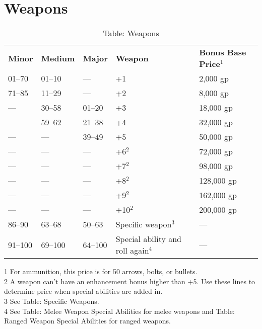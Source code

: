 \section{Weapons}

\label{f0}		
\begin{table}[]
\sffamily
\caption{Table: Weapons}
\begin{tabular}{lllll}
\textbf{Minor} & \textbf{Medium} & \textbf{Major} & \textbf{Weapon} & \textbf{Bonus Base Price\(^{1}\)}\\
01–70 & 01–10 & — & +1 & 2,000 gp\\
71–85 & 11–29 & — & +2 & 8,000 gp\\
— & 30–58 & 01–20 & +3 & 18,000 gp\\
— & 59–62 & 21–38 & +4 & 32,000 gp\\
— & — & 39–49 & +5 & 50,000 gp\\
— & — & — & +6\(^{2}\) & 72,000 gp\\
— & — & — & +7\(^{2}\) & 98,000 gp\\
— & — & — & +8\(^{2}\) & 128,000 gp\\
— & — & — & +9\(^{2}\) & 162,000 gp\\
— & — & — & +10\(^{2}\) & 200,000 gp\\
86–90 & 63–68 & 50–63 & Specific weapon\(^{3}\) & —\\
91–100 & 69–100 & 64–100 & Special ability and roll again\(^{4}\) & —\\
\end{tabular}
1 For ammunition, this price is for 50 arrows, bolts, or bullets. \\
 2 A weapon can't have an enhancement bonus higher than +5. Use these lines to determine price when special abilities are added in. \\
 3 See Table: Specific Weapons. \\
 4 See Table: Melee Weapon Special Abilities for melee weapons and Table: Ranged Weapon Special Abilities for ranged weapons.\\
\end{table}	
